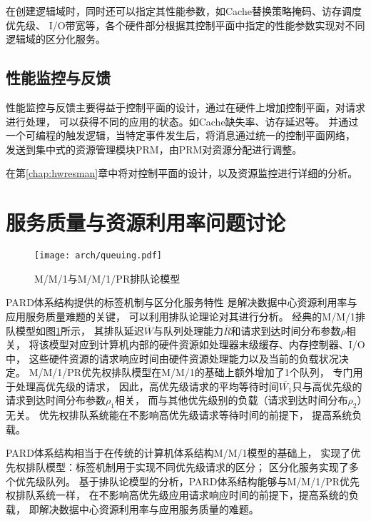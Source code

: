 在创建逻辑域时，同时还可以指定其性能参数，如Cache替换策略掩码、访存调度优先级、
I/O带宽等，各个硬件部分根据其控制平面中指定的性能参数实现对不同逻辑域的区分化服务。



\subsection{性能监控与反馈}

性能监控与反馈主要得益于控制平面的设计，通过在硬件上增加控制平面，对请求进行处理，
可以获得不同的应用的状态。如Cache缺失率、访存延迟等。
并通过一个可编程的触发逻辑，当特定事件发生后，将消息通过统一的控制平面网络，
发送到集中式的资源管理模块PRM，由PRM对资源分配进行调整。

在第\ref{chap:hwresman}章中将对控制平面的设计，以及资源监控进行详细的分析。


\fi


\section{服务质量与资源利用率问题讨论}

\begin{figure}[H]
  \centering
  \texttt{[image: arch/queuing.pdf]}
  \caption{M/M/1与M/M/1/PR排队论模型}
  \label{fig:queuing}
\end{figure}

PARD体系结构提供的标签机制与区分化服务特性
是解决数据中心资源利用率与应用服务质量难题的关键，
可以利用排队论理论对其进行分析。
经典的M/M/1排队模型如图\ref{fig:queuing}所示，
其排队延迟$\overline{W}$与队列处理能力$\overline{R}$和请求到达时间分布参数$\rho$相关，
将该模型对应到计算机内部的硬件资源如处理器末级缓存、内存控制器、I/O中，
这些硬件资源的请求响应时间由硬件资源处理能力以及当前的负载状况决定。
M/M/1/PR优先权排队模型在M/M/1的基础上额外增加了1个队列，
专门用于处理高优先级的请求，
因此，高优先级请求的平均等待时间$\overline{W_1}$只与高优先级的请求到达时间分布参数$\rho_1$相关，
而与其他优先级别的负载（请求到达时间分布$\rho_2$）无关。
优先权排队系统能在不影响高优先级请求等待时间的前提下，
提高系统负载。

PARD体系结构相当于在传统的计算机体系结构M/M/1模型的基础上，
实现了优先权排队模型：标签机制用于实现不同优先级请求的区分；
区分化服务实现了多个优先级队列。
基于排队论模型的分析，PARD体系结构能够与M/M/1/PR优先权排队系统一样，
在不影响高优先级应用请求响应时间的前提下，提高系统的负载，
即解决数据中心资源利用率与应用服务质量的难题。

\iffalse

